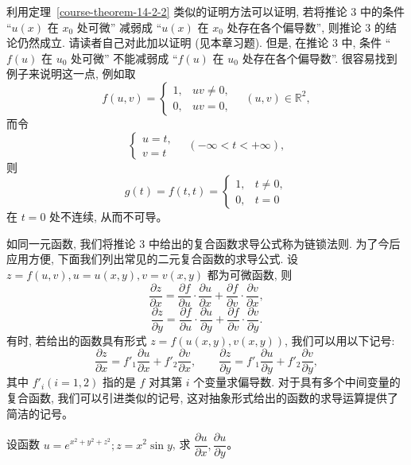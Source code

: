 \documentclass[UTF8,12pt,a4paper,fontset=fandol]{ctexart}
\begin{document}
\begin{remark}\quad 利用定理~\ref{course-theorem-14-2-2}  类似的证明方法可以证明, 若将推论 3 中的条件 ``$u(x)$ 在 $x_0$ 处可微'' 减弱成 ``$u(x)$ 在 $x_0$ 处存在各个偏导数'', 则推论 3 的结论仍然成立. 请读者自己对此加以证明 (见本章习题). 但是, 在推论 3 中, 条件 ``$f(u)$ 在 $u_0$ 处可微'' 不能减弱成 ``$f(u)$ 在 $u_0$ 处存在各个偏导数''. 很容易找到例子来说明这一点, 例如取
\[
  f(u,v)=
  \begin{cases}
    1, &uv\ne0,\\
    0, &uv=0,
  \end{cases}
  \quad (u,v)\in\mathbb R^2,
\]
而令
\[
  \begin{cases}
    u=t,\\
    v=t
  \end{cases}
  \quad(-\infty<t<+\infty),
\]
则
\[
  g(t)=f(t,t)=
  \begin{cases}
    1, &t\ne0,\\
    0, &t=0
  \end{cases}
\]
在 $t=0$ 处不连续, 从而不可导。

如同一元函数, 我们将推论 3 中给出的复合函数求导公式称为链锁法则. 为了今后应用方便, 下面我们列出常见的二元复合函数的求导公式. 设 $z=f(u,v), u=u(x,y), v=v(x,y)$ 都为可微函数, 则
\[
  \frac{\partial z}{\partial x}
  =\frac{\partial f}{\partial u}\cdot\frac{\partial u}{\partial x}
  +\frac{\partial f}{\partial v}\cdot\frac{\partial v}{\partial x},
\]
\[
  \frac{\partial z}{\partial y}
  =\frac{\partial f}{\partial u}\cdot\frac{\partial u}{\partial y}
  +\frac{\partial f}{\partial v}\cdot\frac{\partial v}{\partial y}.
\]
有时, 若给出的函数具有形式 $z=f(u(x,y),v(x,y))$, 我们可以用以下记号:
\[
  \frac{\partial z}{\partial x}=f'_1\frac{\partial u}{\partial x}+f'_2\frac{\partial v}{\partial x},
  \qquad
  \frac{\partial z}{\partial y}=f'_1\frac{\partial u}{\partial y}+f'_2\frac{\partial v}{\partial y},
\]
其中 $f'_i(i=1,2)$ 指的是 $f$ 对其第 $i$ 个变量求偏导数. 对于具有多个中间变量的复合函数, 我们可以引进类似的记号, 这对抽象形式给出的函数的求导运算提供了简洁的记号。

\end{remark}
\begin{example}\label{course-example-14-2-1}\quad 设函数 $u=e^{x^2+y^2+z^2}; z=x^2\sin y$, 求 $\dfrac{\partial u}{\partial x}, \dfrac{\partial u}{\partial y}$。

\end{example}
\end{document}
